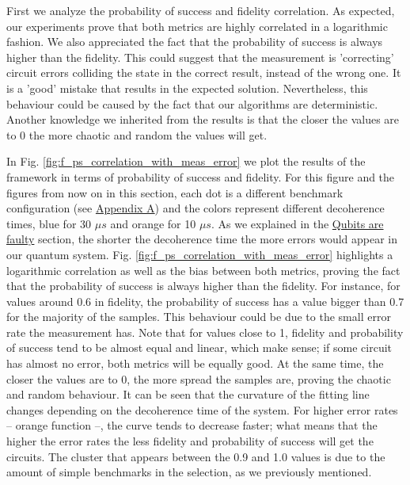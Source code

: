 First we analyze the probability of success and fidelity correlation.
As expected, our experiments prove that both metrics are highly correlated in a logarithmic fashion.
We also appreciated the fact that the probability of success is always higher than the fidelity.
This could suggest that the measurement is 'correcting' circuit errors colliding the state in the correct result, instead of the wrong one.
It is a 'good' mistake that results in the expected solution.
Nevertheless, this behaviour could be caused by the fact that our algorithms are deterministic.
Another knowledge we inherited from the results is that the closer the values are to 0 the more chaotic and random the values will get.



In Fig. \ref{fig:f_ps_correlation_with_meas_error} we plot the results of the framework in terms of probability of success and fidelity. 
For this figure and the figures from now on in this section, each dot is a different benchmark configuration (see \href{appendix-1.org}{Appendix A}) and the colors represent different decoherence times, blue for 30 \(\mu s\) and orange for 10 \(\mu s\).
As we explained in the \href{quantum_computing.org}{Qubits are faulty} section, the shorter the decoherence time the more errors would appear in our quantum system.
Fig. \ref{fig:f_ps_correlation_with_meas_error} highlights a logarithmic correlation as well as the bias between both metrics, proving the fact that the probability of success is always higher than the fidelity.
For instance, for values around 0.6 in fidelity, the probability of success has a value bigger than 0.7 for the majority of the samples.
This behaviour could be due to the small error rate the measurement has.
Note that for values close to 1, fidelity and probability of success tend to be almost equal and linear, which make sense; if some circuit has almost no error, both metrics will be equally good.
At the same time, the closer the values are to 0, the more spread the samples are, proving the chaotic and random behaviour.
It can be seen that the curvature of the fitting line changes depending on the decoherence time of the system.
For higher error rates -- orange function --, the curve tends to decrease faster; what means that the higher the error rates the less fidelity and probability of success will get the circuits.
The cluster that appears between the 0.9 and 1.0 values is due to the amount of simple benchmarks in the selection, as we previously mentioned.

